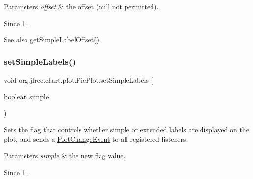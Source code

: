 \begin{DoxyParams}{Parameters}
{\em offset} & the offset ({\ttfamily null} not permitted).\\
\hline
\end{DoxyParams}
\begin{DoxySince}{Since}
1..
\end{DoxySince}
\begin{DoxySeeAlso}{See also}
\mbox{\hyperlink{classorg_1_1jfree_1_1chart_1_1plot_1_1_pie_plot_a224bcc976ff82ad7446319febe4e5b65}{get\+Simple\+Label\+Offset()}} 
\end{DoxySeeAlso}
\mbox{\label{classorg_1_1jfree_1_1chart_1_1plot_1_1_pie_plot_a8a21ac7e67bda81b1caec36453fbac5b}} 
\subsubsection{\texorpdfstring{set\+Simple\+Labels()}{setSimpleLabels()}}
{\footnotesize\ttfamily void org.\+jfree.\+chart.\+plot.\+Pie\+Plot.\+set\+Simple\+Labels (\begin{DoxyParamCaption}\item[{boolean}]{simple }\end{DoxyParamCaption})}

Sets the flag that controls whether simple or extended labels are displayed on the plot, and sends a \mbox{\hyperlink{}{Plot\+Change\+Event}} to all registered listeners.


\begin{DoxyParams}{Parameters}
{\em simple} & the new flag value.\\
\hline
\end{DoxyParams}
\begin{DoxySince}{Since}
1.. 
\end{DoxySince}
\mbox{\label{classorg_1_1jfree_1_1chart_1_1plot_1_1_pie_plot_a66d094282ec15d23beac9147c45eb213}} 
